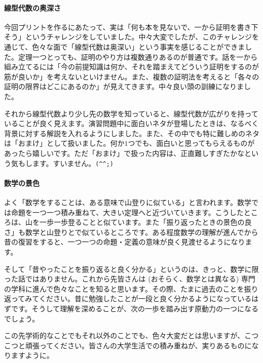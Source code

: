 \paragraph{線型代数の奥深さ}

今回プリントを作るにあたって、実は「何も本を見ないで、一から証明を書き下そう」というチャレンジをしていました。中々大変でしたが、このチャレンジを通じて、色々な面で「線型代数は奥深い」という事実を感じることができました。定理一つとっても、証明のやり方は複数通りあるのが普通です。話を一から組み立てるには「今の前提知識は何か、それを踏まえてどういう証明をするのが筋が良いか」を考えないといけません。また、複数の証明法を考えると「各々の証明の限界はどこにあるのか」が見えてきます。中々良い頭の訓練になりました。

それから線型代数より少し先の数学を知っていると、線型代数が広がりを持っていることが良く見えます。演習問題中に面白いネタが登場したときは、なるべく背景に対する解説を入れるようにしました。また、その中でも特に難しめのネタは「おまけ」として扱いました。何か$1$つでも、面白いと思ってもらえるものがあったら嬉しいです。ただ「おまけ」で扱った内容は、正直難しすぎたかなという気もします。すいません。\verb|(^^;)|

\paragraph{数学の景色}

よく「数学をすることは、ある意味で山登りに似ている」と言われます。数学では命題を一つ一つ積み重ねて、大きい定理へと近づいていきます。こうしたところは、山を一歩一歩登ることと似ています。また「振り返ったときの景色の良さ」も数学と山登りとで似ているところです。ある程度数学の理解が進んでから昔の復習をすると、一つ一つの命題・定義の意味が良く見渡せるようになります。

そして「昔やったことを振り返ると良く分かる」というのは、きっと、数学に限った話ではありません。これから先皆さんは (おそらく、数学とは異なる) 専門の学科に進んで色々なことを知ると思います。その際、たまに過去のことを振り返ってみてください。昔に勉強したことが一段と良く分かるようになっているはずです。そうして理解を深めることが、次の一歩を踏み出す原動力の一つになるでしょう。

この先学術的なことでもそれ以外のことでも、色々大変だとは思いますが、こつこつと頑張ってください。皆さんの大学生活での積み重ねが、実りあるものになりますように。

